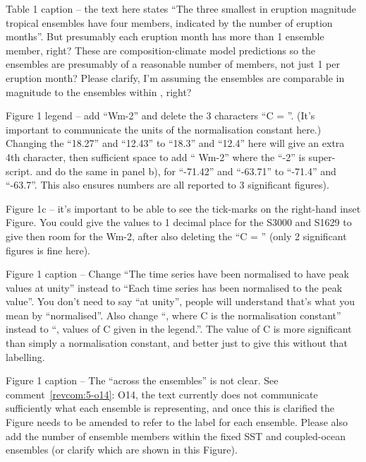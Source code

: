 \documentclass{reviewresponse}
\let\citeA\shortciteA %
\begin{document}
  \begin{revcomment}[after title={: O14},colframe={colorcommentresolved}]
    \label{revcom:5-o14} Table 1 caption -- the text here states ``The three smallest in
    eruption magnitude tropical ensembles have four members, indicated by the number of
    eruption months''. But presumably each eruption month has more than 1 ensemble
    member, right? These are composition-climate model predictions so the ensembles are
    presumably of a reasonable number of members, not just 1 per eruption month? Please
    clarify, I'm assuming the ensembles are comparable in magnitude to the ensembles
    within \citeA{mcgraw2024}, right?
  \end{revcomment}
  \begin{revcomment}[after title={: O15},colframe={colorcommentresolved}]
    \label{revcom:5-o15} Figure 1 legend -- add ``Wm-2'' and delete the 3 characters ``C
    = ''. (It's important to communicate the units of the normalisation constant here.)
    Changing the ``18.27'' and ``12.43'' to ``18.3'' and ``12.4'' here will give an
    extra 4th character, then sufficient space to add `` Wm-2'' where the ``-2'' is
    super-script. and do the same in panel b), for ``-71.42'' and ``-63.71'' to
    ``-71.4'' and ``-63.7''. This also ensures numbers are all reported to 3 significant
    figures).
  \end{revcomment}
  \begin{revcomment}[after title={: O16},colframe={colorcommentresolved}]
    Figure 1c -- it's important to be able to see the tick-marks on the right-hand inset
    Figure. You could give the values to 1 decimal place for the S3000 and S1629 to give
    then room for the Wm-2, after also deleting the ``C = '' (only 2 significant figures
    is fine here).
  \end{revcomment}
  \begin{revcomment}[after title={: O17},colframe={colorcommentresolved}]
    Figure 1 caption -- Change ``The time series have been normalised to have peak
    values at unity'' instead to ``Each time series has been normalised to the peak
    value''. You don't need to say ``at unity'', people will understand that's what you
    mean by ``normalised''. Also change ``, where C is the normalisation constant''
    instead to ``, values of C given in the legend.''. The value of C is more
    significant than simply a normalisation constant, and better just to give this
    without that labelling.
  \end{revcomment}
  \begin{revcomment}[after title={: O18},colframe={colorcommentresolved}]
    Figure 1 caption -- The ``across the ensembles'' is not clear. See
    comment~\ref{revcom:5-o14}: O14, the text currently does not communicate
    sufficiently what each ensemble is representing, and once this is clarified the
    Figure needs to be amended to refer to the label for each ensemble. Please also add
    the number of ensemble members within the fixed SST and coupled-ocean ensembles (or
    clarify which are shown in this Figure).
  \end{revcomment}
\end{document}
